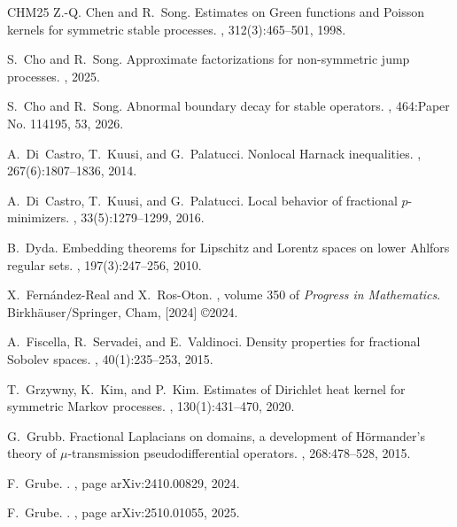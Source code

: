 \documentclass[11pt]{amsart}
\theoremstyle{plain}
\theoremstyle{definition}
\numberwithin{equation}{section}
\begin{document}
\begin{thebibliography}{CHM{\etalchar{+}}25}
Z.-Q. Chen and R.~Song.
\newblock Estimates on {G}reen functions and {P}oisson kernels for symmetric
  stable processes.
, 312(3):465--501, 1998.

S.~Cho and R.~Song.
\newblock Approximate factorizations for non-symmetric jump processes.
, 2025.

S.~Cho and R.~Song.
\newblock Abnormal boundary decay for stable operators.
, 464:Paper No. 114195, 53, 2026.

A.~Di~Castro, T.~Kuusi, and G.~Palatucci.
\newblock Nonlocal {H}arnack inequalities.
, 267(6):1807--1836, 2014.

A.~Di~Castro, T.~Kuusi, and G.~Palatucci.
\newblock Local behavior of fractional {$p$}-minimizers.
,
  33(5):1279--1299, 2016.

B.~Dyda.
\newblock Embedding theorems for {L}ipschitz and {L}orentz spaces on lower
  {A}hlfors regular sets.
, 197(3):247--256, 2010.

X.~Fern\'andez-Real and X.~Ros-Oton.
, volume 350 of {\em
  Progress in Mathematics}.
\newblock Birkh\"auser/Springer, Cham, [2024] \copyright 2024.

A.~Fiscella, R.~Servadei, and E.~Valdinoci.
\newblock Density properties for fractional {S}obolev spaces.
, 40(1):235--253, 2015.

T.~Grzywny, K.~Kim, and P.~Kim.
\newblock Estimates of {D}irichlet heat kernel for symmetric {M}arkov
  processes.
, 130(1):431--470, 2020.

G.~Grubb.
\newblock Fractional {L}aplacians on domains, a development of {H}\"ormander's
  theory of {$\mu$}-transmission pseudodifferential operators.
, 268:478--528, 2015.

F.~{Grube}.
.
, page arXiv:2410.00829, 2024.

F.~{Grube}.
.
, page arXiv:2510.01055, 2025.


\end{thebibliography}
\end{document}
